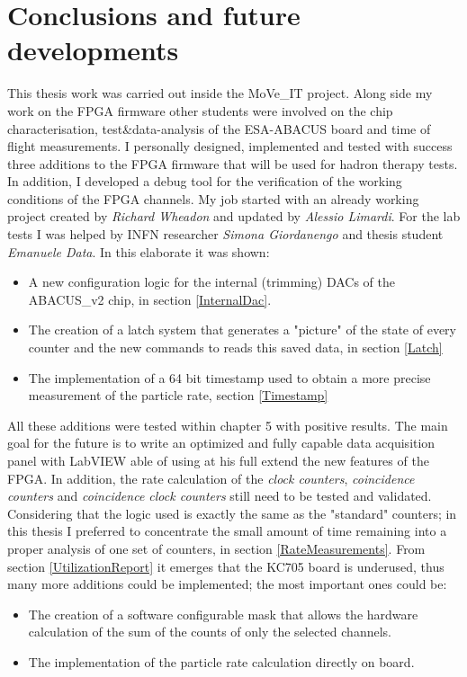 


\newpage
\section*{Conclusions and future developments}
\pagestyle{plain}
\noindent This thesis work was carried out inside the MoVe\_IT project.
Along side my work on the FPGA firmware other students were involved on the chip characterisation, test\&data-analysis of the ESA-ABACUS board and time of flight measurements.
I personally designed, implemented and tested with success three additions to the FPGA firmware that will be used for hadron therapy tests.
In addition, I developed a debug tool for the verification of the working conditions of the FPGA channels.
My job started with an already working project created by \textit{Richard Wheadon} and updated by \textit{Alessio Limardi}.
For the lab tests I was helped by INFN researcher \textit{Simona Giordanengo} and thesis student \textit{Emanuele Data}.
In this elaborate it was shown:
\begin{itemize}
	\item A new configuration logic for the internal (trimming) DACs of the ABACUS\_v2 chip, in section \ref{InternalDac}.
	\item The creation of a latch system that generates a "picture" of the state of every counter and the new commands to reads this saved data, in section \ref{Latch}
	\item The implementation of a 64 bit timestamp used to obtain a more precise measurement of the particle rate, section \ref{Timestamp}
\end{itemize}
\noindent All these additions were tested within chapter 5 with positive results.
The main goal for the future is to write an optimized and fully capable data acquisition panel with LabVIEW able of using at his full extend the new features of the FPGA.
In addition, the rate calculation of the \textit{clock counters}, \textit{coincidence counters} and \textit{coincidence clock counters} still need to be tested and validated. Considering that the logic used is exactly the same as the "standard" counters; in this thesis I preferred to concentrate the small amount of time remaining into a proper analysis of one set of counters, in section \ref{RateMeasurements}.
From section \ref{UtilizationReport} it emerges that the KC705 board is underused, thus many more additions could be implemented; the most important ones could be:
\begin{itemize}
	\item The creation of a software configurable mask that allows the hardware calculation of the sum of the counts of only the selected channels.  
	\item The implementation of the particle rate calculation directly on board.
\end{itemize}


